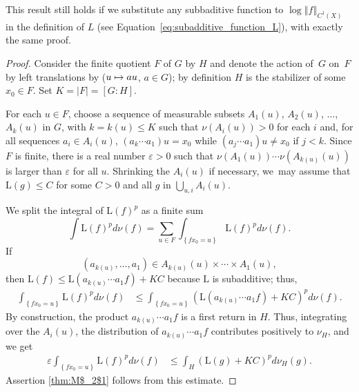 \documentclass[JEP,XML,SOM,Unicode,published]{cedram}
\newcommand\mto{\mathchoice{\longmapsto}{\mapsto}{\mapsto}{\mapsto}}
\let\e\varepsilon
\newcommand{\set}[1]{\left\{#1\right\}}
\newcommand{\norm}[1]{{\left\Vert#1\right\Vert}}
\theoremstyle{plain}
\theoremstyle{definition}
\begin{document}
This result still holds if we substitute any subbaditive function to $ \log\norm{f}_{C^1(X)}$ in the definition of $L$ (see Equation~\ref{eq:subadditive_function_L}), with exactly the same proof.
\begin{proof}
Consider the finite quotient $F$ of $G$ by $H$ and denote the action of~$G$ on~$F$ by left translations by ($u\mto au$, $a\in G$); by definition $H$ is the stabilizer of some $x_0\in F$. Set $K=\vert F\vert = [G: H]$.

For each $u\in F$, choose a sequence of measurable subsets $A_1(u)$, $A_2(u)$, $\ldots$, $A_k(u)$ in $G$, with $k=k(u)\leq K$
such that $\nu(A_i(u))>0$ for each $i$ and, for all sequences $a_i\in A_i(u)$, $(a_k \cdots a_1) u= x_0$
while $(a_j \cdots a_1) u\neq x_0$ if $j<k$. Since $F$ is finite, there is a real
number $\e >0$ such that $\nu(A_1(u))\cdots \nu(A_{k(u)}(u))$ is larger than $\e$ for all $u$. Shrinking the $A_i(u)$ if necessary, we~may assume that $\mathrm L(g)\leq C$ for some $C>0$ and all $g$ in $\bigcup_{u,i}A_i(u)$.

We split the integral of $ \mathrm L(f)^p$ as a finite sum\vspace*{-3pt}
\[
\int \mathrm L(f)^pd\nu(f) = \sum_{u\in F}\int_{\set{fx_0=u }} \mathrm L(f)^pd\nu(f).
\]
If\vspace*{-5pt}
\begin{equation*}
(a_{k(u)}, \ldots, a_1)\in A_{k(u)}(u)\times \cdots \times A_1(u),
\end{equation*}
then $\mathrm L(f)\leq \mathrm L(a_{k(u)} \cdots a_1 f)+K C$ because $\mathrm L$ is subadditive; thus,\vspace*{-3pt}
\begin{align*}
\int_{\set{fx_0=u }} \mathrm L(f)^pd\nu(f) & \leq \int_{\set{fx_0=u }} (\mathrm L(a_{k(u)} \cdots a_1 f)+KC)^pd\nu(f).
\end{align*}
By construction, the product $a_{k(u)} \cdots a_1 f$ is a first return in $H$. Thus,
integrating over the $A_i(u)$, the distribution of $a_{k(u)} \cdots a_1 f$ contributes positively
to $\nu_H$, and we get
\begin{align*}
\e \int_{\set{fx_0=u }} \mathrm L(f)^pd\nu(f) & \leq \int_H (\mathrm L(g)+KC)^pd\nu_H(g).
\end{align*}
Assertion \eqref{thm:M$_2$1} follows from this estimate.


\end{proof}
\end{document}
